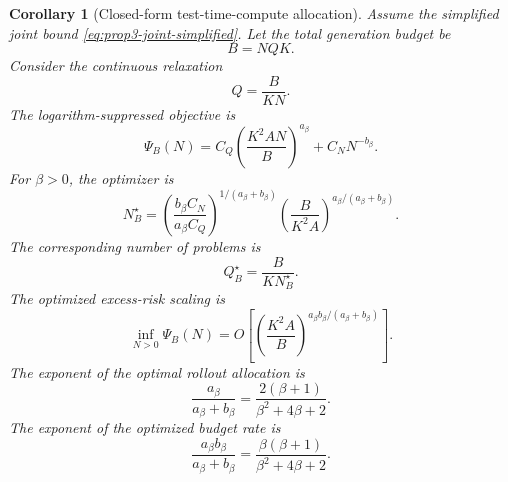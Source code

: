 \documentclass{article} %
\newtheorem{corollary}[theorem]{Corollary}
\begin{document}
\begin{corollary}[Closed-form test-time-compute allocation]
\label{cor:app3-budget}
Assume the simplified joint bound \eqref{eq:prop3-joint-simplified}.  Let the
total generation budget be
\begin{equation}
\label{eq:budget-total-app3}
B=NQK.
\end{equation}
Consider the continuous relaxation
\begin{equation}
\label{eq:budget-Q-of-N}
Q=\frac{B}{KN}.
\end{equation}
The logarithm-suppressed objective is
\begin{equation}
\label{eq:budget-objective-app3}
\Psi_B(N)
=
C_Q
\left(\frac{K^2AN}{B}\right)^{a_\beta}
+
C_NN^{-b_\beta}.
\end{equation}
For \(\beta>0\), the optimizer is
\begin{equation}
\label{eq:budget-Nstar-app3}
N_B^\star
=
\left(
\frac{b_\beta C_N}{a_\beta C_Q}
\right)^{1/(a_\beta+b_\beta)}
\left(
\frac{B}{K^2A}
\right)^{a_\beta/(a_\beta+b_\beta)}.
\end{equation}
The corresponding number of problems is
\begin{equation}
\label{eq:budget-Qstar-app3}
Q_B^\star
=
\frac{B}{K N_B^\star}.
\end{equation}
The optimized excess-risk scaling is
\begin{equation}
\label{eq:budget-rate-app3}
\inf_{N>0}\Psi_B(N)
=
O\!\left[
\left(\frac{K^2A}{B}\right)^{
a_\beta b_\beta/(a_\beta+b_\beta)
}
\right].
\end{equation}
The exponent of the optimal rollout allocation is
\begin{equation}
\label{eq:budget-N-exp}
\frac{a_\beta}{a_\beta+b_\beta}
=
\frac{2(\beta+1)}{\beta^2+4\beta+2}.
\end{equation}
The exponent of the optimized budget rate is
\begin{equation}
\label{eq:budget-rate-exp}
\frac{a_\beta b_\beta}{a_\beta+b_\beta}
=
\frac{\beta(\beta+1)}{\beta^2+4\beta+2}.
\end{equation}
\end{corollary}
\end{document}
